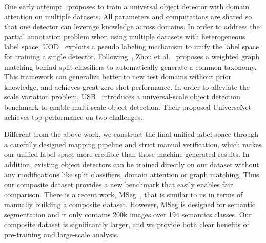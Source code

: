 \documentclass[10pt,twocolumn,letterpaper]{article}
\begin{document}
One early attempt~\cite{wang2019towards} proposes to train a universal object detector with domain attention on multiple datasets. All parameters and computations are shared so that one detector can leverage knowledge across domains. 
In order to address the partial annotation problem when using multiple datasets with heterogeneous label space, UOD~\cite{zhao2020object} exploits a pseudo labeling mechanism to unify the label space for training a single detector.
Following~\cite{wang2019towards}, Zhou et al.~\cite{zhou2021simple} proposes a weighted graph matching behind split classifiers to automatically generate a common taxonomy. This framework can generalize better to new test domains without prior knowledge, and achieves great zero-shot performance.
In order to alleviate the scale variation problem, USB~\cite{shinya2021usb} introduces a universal-scale object detection benchmark to enable multi-scale object detection. Their proposed UniverseNet achieves top performance on two challenges. 

Different from the above work, we construct the final unified label space through a carefully designed mapping pipeline and strict manual verification, which makes our unified label space more credible than those machine generated results. In addition, existing object detectors can be trained directly on our dataset without any modifications like split classifiers, domain attention or graph matching. Thus our composite dataset provides a new benchmark that easily enables fair comparison. There is a recent work, MSeg~\cite{lambert2020mseg}, that is similar to us in terms of manually building a composite dataset. However, MSeg is designed for semantic segmentation and it only contains 200k images over 194 semantics classes. Our composite dataset is significantly larger, and we provide both clear benefits of pre-training and large-scale analysis.
\end{document}
